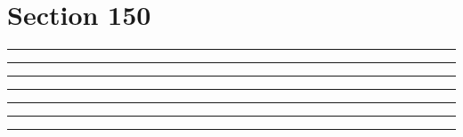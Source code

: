 \documentclass[11pt,a4paper]{article}
\begin{document}
\section{Section 150}
\begin{swarmwrap}%
  \begin{minipage}[t]{4cm}
    \centering
    \textcolor{red!20}{\rule{\linewidth}{8cm}}
  \end{minipage}%
\end{swarmwrap}%
\swarmwrapnext\lipsum[1]
\begin{swarmwrap}%
  \begin{minipage}[t]{5cm}
    \centering
    \textcolor{red!20}{\rule{\linewidth}{9cm}}
  \end{minipage}%
\end{swarmwrap}%
\swarmwrapnext\lipsum[1]\lipsum[2]
\begin{swarmwrap}%
  \begin{minipage}[t]{2cm}
    \centering
    \textcolor{red!20}{\rule{\linewidth}{10cm}}
  \end{minipage}%
\end{swarmwrap}%
\swarmwrapnext\lipsum[1]\lipsum[2]\lipsum[3]
\begin{swarmwrap}%
  \begin{minipage}[t]{3cm}
    \centering
    \textcolor{red!20}{\rule{\linewidth}{2cm}}
  \end{minipage}%
\end{swarmwrap}%
\swarmwrapnext\lipsum[1]\lipsum[2]\lipsum[3]\lipsum[4]
\begin{swarmwrap}%
  \begin{minipage}[t]{4cm}
    \centering
    \textcolor{red!20}{\rule{\linewidth}{3cm}}
  \end{minipage}%
\end{swarmwrap}%
\swarmwrapnext\lipsum[1]\lipsum[2]\lipsum[3]\lipsum[4]\lipsum[5]
\begin{swarmwrap}%
  \begin{minipage}[t]{5cm}
    \centering
    \textcolor{red!20}{\rule{\linewidth}{4cm}}
  \end{minipage}%
\end{swarmwrap}%
\swarmwrapnext\lipsum[1]\lipsum[2]\lipsum[3]\lipsum[4]\lipsum[5]\lipsum[6]
\begin{swarmwrap}%
  \begin{minipage}[t]{2cm}
    \centering
    \textcolor{red!20}{\rule{\linewidth}{5cm}}
  \end{minipage}%
\end{swarmwrap}%
\end{document}
